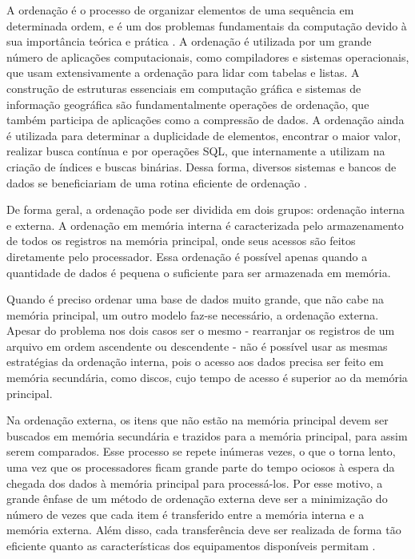 A ordenação é o processo de organizar elementos de uma sequência em determinada ordem, e é um dos problemas fundamentais da computação devido à sua importância teórica e prática \cite{Knuth:1998, Cormen:2009}. 
A ordenação é utilizada por um grande número de aplicações computacionais, como compiladores e sistemas operacionais, que usam extensivamente a ordenação para lidar com tabelas e listas. 
A construção de estruturas essenciais em computação gráfica e sistemas de informação geográfica são fundamentalmente operações de ordenação, que também participa de aplicações como a compressão de dados. A ordenação ainda é utilizada para determinar a duplicidade de elementos, encontrar o maior valor, realizar busca contínua e por operações SQL, que internamente a utilizam na criação de índices e buscas binárias. Dessa forma, diversos sistemas e bancos de dados se beneficiariam de uma rotina eficiente de ordenação \cite{Lauterbach:2009, Satish:2009 , Dean:2008}.




De forma geral, a ordenação pode ser dividida em dois grupos: ordenação interna e externa. 
A ordenação em memória interna é caracterizada pelo armazenamento de todos os registros na memória principal, onde seus acessos são feitos diretamente pelo processador. Essa ordenação é possível apenas quando a quantidade de dados é pequena o suficiente para ser armazenada em memória. 

Quando é preciso ordenar uma base de dados muito grande, que não cabe na memória principal, um outro modelo faz-se necessário, a ordenação externa.
Apesar do problema nos dois casos ser o mesmo - rearranjar os registros de um arquivo em ordem ascendente ou descendente - não é possível usar as mesmas estratégias da ordenação interna, pois o acesso aos dados precisa ser feito em memória secundária, como discos, cujo tempo de acesso é superior ao da memória principal.  %

Na ordenação externa, os itens que não estão na memória principal devem ser buscados em memória secundária e trazidos para a memória principal, para assim serem comparados. Esse processo se repete inúmeras vezes, o que o torna lento, uma vez que os processadores ficam grande parte do tempo ociosos à espera da chegada dos dados à memória principal para processá-los. Por esse motivo, a grande ênfase de um método de ordenação externa deve ser a minimização do número de vezes que cada item é transferido entre a memória interna e a memória externa. Além disso, cada transferência deve ser realizada de forma tão eficiente quanto as características dos equipamentos disponíveis permitam \cite{Ziviani:2007}.



